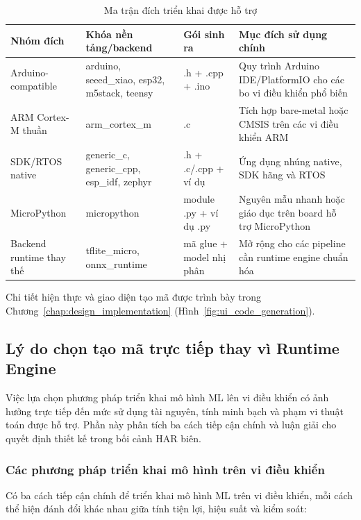 \begin{table}[H]
    \centering
    \caption{Ma trận đích triển khai được hỗ trợ}
    \label{tab:deployment_target_matrix}
    \small
    \begin{tabular}{@{}p{2.6cm}p{2.8cm}p{2.6cm}p{4.6cm}@{}}
        \toprule
        Nhóm đích & Khóa nền tảng/backend & Gói sinh ra & Mục đích sử dụng chính \\
        \midrule
        Arduino-compatible & arduino, seeed\_xiao, esp32, m5stack, teensy & .h + .cpp + .ino & Quy trình Arduino IDE/PlatformIO cho các bo vi điều khiển phổ biến \\
        ARM Cortex-M thuần & arm\_cortex\_m & .c & Tích hợp bare-metal hoặc CMSIS trên các vi điều khiển ARM \\
        SDK/RTOS native & generic\_c, generic\_cpp, esp\_idf, zephyr & .h + .c/.cpp + ví dụ & Ứng dụng nhúng native, SDK hãng và RTOS \\
        MicroPython & micropython & module .py + ví dụ .py & Nguyên mẫu nhanh hoặc giáo dục trên board hỗ trợ MicroPython \\
        Backend runtime thay thế & tflite\_micro, onnx\_runtime & mã glue + model nhị phân & Mở rộng cho các pipeline cần runtime engine chuẩn hóa \\
        \bottomrule
    \end{tabular}
\end{table}

Chi tiết hiện thực và giao diện tạo mã được trình bày trong Chương~\ref{chap:design_implementation} (Hình~\ref{fig:ui_code_generation}).

\subsection{Lý do chọn tạo mã trực tiếp thay vì Runtime Engine}
\label{sec:codegen_rationale}

Việc lựa chọn phương pháp triển khai mô hình ML lên vi điều khiển có ảnh hưởng trực tiếp đến mức sử dụng tài nguyên, tính minh bạch và phạm vi thuật toán được hỗ trợ. Phần này phân tích ba cách tiếp cận chính và luận giải cho quyết định thiết kế trong bối cảnh HAR biên.

\subsubsection{Các phương pháp triển khai mô hình trên vi điều khiển}

Có ba cách tiếp cận chính để triển khai mô hình ML trên vi điều khiển, mỗi cách thể hiện đánh đổi khác nhau giữa tính tiện lợi, hiệu suất và kiểm soát:

